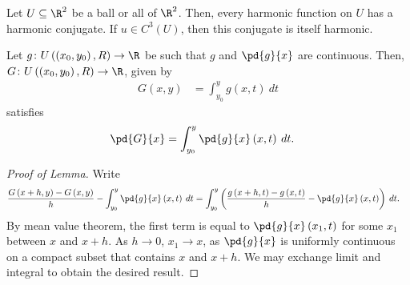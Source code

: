 \documentclass[10pt]{mypackage}
\begin{document}
\begin{theorem}
  Let $U\subseteq \R^{2}$ be a ball or all of $\R^{2}$. Then, every harmonic function on $U$ has a harmonic conjugate. If $u\in C^{3}\left( U \right)$, then this conjugate is itself harmonic.
\end{theorem}
\begin{lemma}
  Let $g\colon U\left( \left( x_0,y_0 \right),R \right)\rightarrow \R$ be such that $g$ and $ \pd{g}{x} $ are continuous. Then, $G\colon U\left( \left( x_0,y_0 \right),R \right)\rightarrow \R$, given by
  \begin{align*}
    G\left(x,y\right) &= \int_{y_0}^{y} g\left( x,t \right)\:dt
  \end{align*}
  satisfies
  \begin{align*}
    \pd{G}{x} &= \int_{y_0}^{y} \pd{g}{x}\left( x,t \right)\:dt.
  \end{align*}
\end{lemma}
\begin{proof}[Proof of Lemma]
  Write
  \begin{align*}
    \frac{G\left( x + h,y \right) - G\left( x,y \right)}{h} - \int_{y_0}^{y} \pd{g}{x}\left( x,t \right)\:dt &= \int_{y_0}^{y} \left( \frac{g\left( x+h,t \right)-g\left( x,t \right)}{h} - \pd{g}{x}\left( x,t \right) \right)\:dt.
  \end{align*}
  By mean value theorem, the first term is equal to $ \pd{g}{x}\left( x_1,t \right) $ for some $x_1$ between $x$ and $x + h$. As $h\rightarrow 0$, $x_1\rightarrow x$, as $ \pd{g}{x} $ is uniformly continuous on a compact subset that contains $x$ and $x + h$. We may exchange limit and integral to obtain the desired result.
\end{proof}
\end{document}
